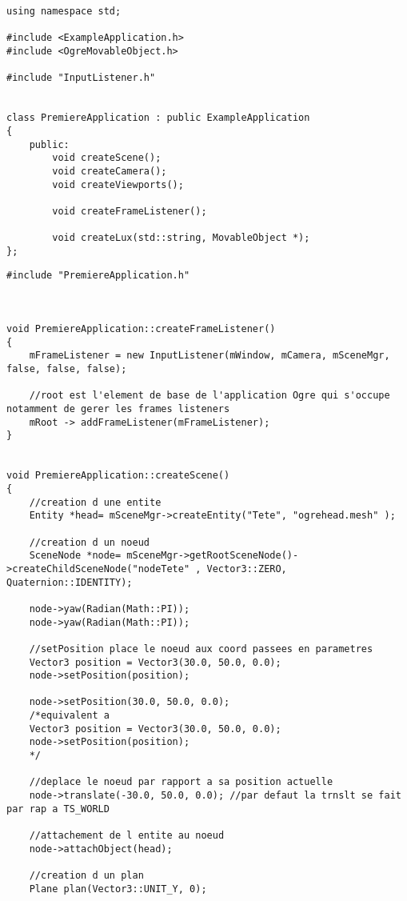 \begin{lstlisting}[caption={PremiereApplication.h}]
using namespace std;

#include <ExampleApplication.h>
#include <OgreMovableObject.h>

#include "InputListener.h"


class PremiereApplication : public ExampleApplication
{
    public:
        void createScene();
        void createCamera();
        void createViewports();

        void createFrameListener();
        
        void createLux(std::string, MovableObject *);
};
\end{lstlisting}


\begin{lstlisting}[caption={PremiereApplication.cpp}]
#include "PremiereApplication.h"



void PremiereApplication::createFrameListener()
{
    mFrameListener = new InputListener(mWindow, mCamera, mSceneMgr, false, false, false);
    
    //root est l'element de base de l'application Ogre qui s'occupe notamment de gerer les frames listeners
    mRoot -> addFrameListener(mFrameListener);
}


void PremiereApplication::createScene()
{
    //creation d une entite
    Entity *head= mSceneMgr->createEntity("Tete", "ogrehead.mesh" );
    
    //creation d un noeud
    SceneNode *node= mSceneMgr->getRootSceneNode()->createChildSceneNode("nodeTete" , Vector3::ZERO, Quaternion::IDENTITY);
    
    node->yaw(Radian(Math::PI));
    node->yaw(Radian(Math::PI));

    //setPosition place le noeud aux coord passees en parametres
    Vector3 position = Vector3(30.0, 50.0, 0.0);
    node->setPosition(position);

    node->setPosition(30.0, 50.0, 0.0); 
    /*equivalent a
    Vector3 position = Vector3(30.0, 50.0, 0.0);
    node->setPosition(position);
    */

    //deplace le noeud par rapport a sa position actuelle
    node->translate(-30.0, 50.0, 0.0); //par defaut la trnslt se fait par rap a TS_WORLD
   
    //attachement de l entite au noeud
    node->attachObject(head);

    //creation d un plan
    Plane plan(Vector3::UNIT_Y, 0);


\end{lstlisting}
